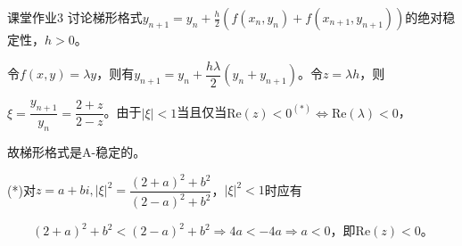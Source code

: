 \documentclass[10pt]{beamer}
\begin{document}
    \begin{frame}{课堂作业3}
        讨论梯形格式$y_{n+1}=y_n+\frac h2(f(x_n,y_n)+f(x_{n+1},y_{n+1}))$的绝对稳定性，$h>0$。\vspace{1cm}

        \pause 令$f(x,y)=\lambda y$，则有$y_{n+1}=y_n+\dfrac{h\lambda}2(y_n+y_{n+1})$。令$z=\lambda h$，则

        \pause $\xi=\dfrac{y_{n+1}}{y_n}=\dfrac{2+z}{2-z}$。由于$|\xi|<1$当且仅当$\mathrm{Re}(z)<0^{(*)}\Leftrightarrow\mathrm{Re}(\lambda)<0$，

        \pause 故梯形格式是A-稳定的。\vspace{0.5cm}

        \pause (*)对$z=a+bi,|\xi|^2=\dfrac{(2+a)^2+b^2}{(2-a)^2+b^2}$，$|\xi|^2<1$时应有

        \pause $\qquad(2+a)^2+b^2<(2-a)^2+b^2\Rightarrow 4a<-4a\Rightarrow a<0$，即$\mathrm{Re}(z)<0$。

    \end{frame}
\end{document}

